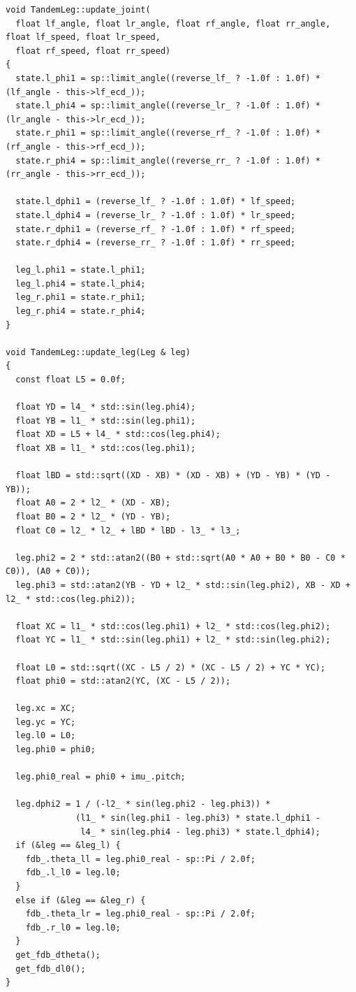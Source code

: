 \documentclass[
  oneside,
  degree=bachelor,
  fullwidthstop=false,
  fontset=fandol,
  times=false,
  minted=true,
  biblatex=true,
]{tongjithesis}
\begin{document}
\begin{verbatim}
void TandemLeg::update_joint(
  float lf_angle, float lr_angle, float rf_angle, float rr_angle, float lf_speed, float lr_speed,
  float rf_speed, float rr_speed)
{
  state.l_phi1 = sp::limit_angle((reverse_lf_ ? -1.0f : 1.0f) * (lf_angle - this->lf_ecd_));
  state.l_phi4 = sp::limit_angle((reverse_lr_ ? -1.0f : 1.0f) * (lr_angle - this->lr_ecd_));
  state.r_phi1 = sp::limit_angle((reverse_rf_ ? -1.0f : 1.0f) * (rf_angle - this->rf_ecd_));
  state.r_phi4 = sp::limit_angle((reverse_rr_ ? -1.0f : 1.0f) * (rr_angle - this->rr_ecd_));

  state.l_dphi1 = (reverse_lf_ ? -1.0f : 1.0f) * lf_speed;
  state.l_dphi4 = (reverse_lr_ ? -1.0f : 1.0f) * lr_speed;
  state.r_dphi1 = (reverse_rf_ ? -1.0f : 1.0f) * rf_speed;
  state.r_dphi4 = (reverse_rr_ ? -1.0f : 1.0f) * rr_speed;

  leg_l.phi1 = state.l_phi1;
  leg_l.phi4 = state.l_phi4;
  leg_r.phi1 = state.r_phi1;
  leg_r.phi4 = state.r_phi4;
}

void TandemLeg::update_leg(Leg & leg)
{
  const float L5 = 0.0f;

  float YD = l4_ * std::sin(leg.phi4);
  float YB = l1_ * std::sin(leg.phi1);
  float XD = L5 + l4_ * std::cos(leg.phi4);
  float XB = l1_ * std::cos(leg.phi1);

  float lBD = std::sqrt((XD - XB) * (XD - XB) + (YD - YB) * (YD - YB));
  float A0 = 2 * l2_ * (XD - XB);
  float B0 = 2 * l2_ * (YD - YB);
  float C0 = l2_ * l2_ + lBD * lBD - l3_ * l3_;

  leg.phi2 = 2 * std::atan2((B0 + std::sqrt(A0 * A0 + B0 * B0 - C0 * C0)), (A0 + C0));
  leg.phi3 = std::atan2(YB - YD + l2_ * std::sin(leg.phi2), XB - XD + l2_ * std::cos(leg.phi2));

  float XC = l1_ * std::cos(leg.phi1) + l2_ * std::cos(leg.phi2);
  float YC = l1_ * std::sin(leg.phi1) + l2_ * std::sin(leg.phi2);

  float L0 = std::sqrt((XC - L5 / 2) * (XC - L5 / 2) + YC * YC);
  float phi0 = std::atan2(YC, (XC - L5 / 2));

  leg.xc = XC;
  leg.yc = YC;
  leg.l0 = L0;
  leg.phi0 = phi0;

  leg.phi0_real = phi0 + imu_.pitch;

  leg.dphi2 = 1 / (-l2_ * sin(leg.phi2 - leg.phi3)) *
              (l1_ * sin(leg.phi1 - leg.phi3) * state.l_dphi1 -
               l4_ * sin(leg.phi4 - leg.phi3) * state.l_dphi4);
  if (&leg == &leg_l) {
    fdb_.theta_ll = leg.phi0_real - sp::Pi / 2.0f;
    fdb_.l_l0 = leg.l0;
  }
  else if (&leg == &leg_r) {
    fdb_.theta_lr = leg.phi0_real - sp::Pi / 2.0f;
    fdb_.r_l0 = leg.l0;
  }
  get_fdb_dtheta();
  get_fdb_dl0();
}


\end{verbatim}
\end{document}
